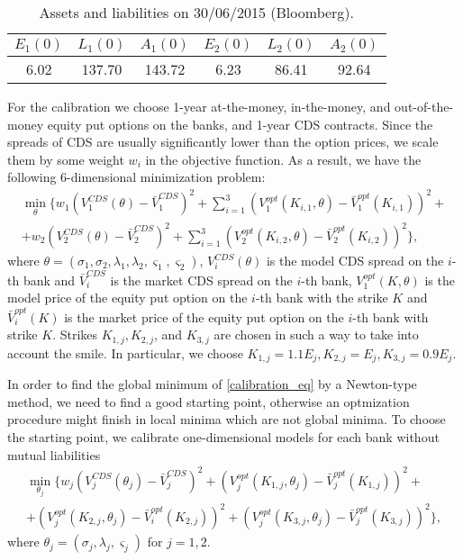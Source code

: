 \begin{table}[H]
	\begin{center}
		\begin{tabular}{| c | c | c | c | c | c |}
			\hline
			$E_1(0)$ & $L_1(0)$ & $A_1(0)$ & $E_2(0)$ & $L_2(0)$ & $A_2(0)$  \\ 
			\hline
			6.02&  137.70& 143.72& 6.23 & 86.41 & 92.64 \\
			\hline
		\end{tabular}
		\caption{Assets and liabilities on 30/06/2015 (Bloomberg).}
		\label{data_table}	
	\end{center}
\end{table}
For the calibration we choose 1-year at-the-money, in-the-money, and out-of-the-money equity put options on the banks, and 1-year CDS contracts. Since the spreads of CDS are usually significantly lower than the option prices, we scale them by some weight $w_i$ in the objective function. As a result, we have the following 6-dimensional minimization problem:
\begin{multline}
	\label{calibration_eq}
	\min_{\theta} \{ w_1 (V^{CDS}_1(\theta) - \bar{V}^{CDS}_1)^2 + \sum \limits_{i = 1}^3 (V^{opt}_1(K_{i, 1}, \theta) - \bar{V}^{opt}_1(K_{i, 1}))^2 + \\
	+ w_2 (V^{CDS}_2(\theta) - \bar{V}^{CDS}_2)^2  + \sum \limits_{i = 1}^3 (V^{opt}_2(K_{i, 2}, \theta) - \bar{V}^{opt}_2(K_{i, 2}))^2  \},
\end{multline}
 where $\theta = (\sigma_1, \sigma_2, \lambda_1, \lambda_2, \varsigma_1, \varsigma_2)$, $V^{CDS}_i(\theta)$ is the model CDS spread on the $i$-th bank and $\bar{V}^{CDS}_i$ is the market CDS spread on the $i$-th bank, $V^{opt}_1(K, \theta)$ is the model price of the equity put option on the $i$-th bank with the strike $K$ and $\bar{V}^{opt}_i(K)$ is the market price of the equity put option on the $i$-th bank with strike $K$. Strikes $K_{1, j}, K_{2, j}$, and $K_{3, j}$ are chosen in such a way to take into account the smile. In particular, we choose $K_{1, j} = 1.1 E_j, K_{2, j} = E_j, K_{3, j} = 0.9 E_j$.

In order to find the global minimum of \eqref{calibration_eq} by a Newton-type method, we need to find a good starting point, otherwise an optmization procedure might finish in local minima which are not global minima. To choose the starting point, we calibrate one-dimensional models for each bank without mutual liabilities
\begin{multline}
	\label{calibration_eq1d}
	\min_{\theta_j} \{ w_j (V^{CDS}_j(\theta_j) - \bar{V}^{CDS}_j)^2 + (V^{opt}_j(K_{1, j}, \theta_j) - \bar{V}^{opt}_j(K_{1, j}))^2 + \\
	+(V^{opt}_j(K_{2, j}, \theta_j) - \bar{V}^{opt}_i(K_{2, j}))^2  + (V^{opt}_j(K_{3, j}, \theta_j) - \bar{V}^{opt}_j(K_{3, j}))^2  \},
\end{multline}
where $\theta_j = (\sigma_j, \lambda_j, \varsigma_j)$ for $j = 1, 2$.

